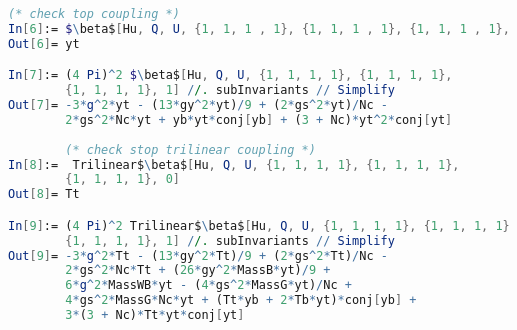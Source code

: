 \documentclass{scrartcl}
\begin{document}
\begin{lstlisting}[language=mathematica,mathescape,columns=flexible,backgroundcolor=\color{light-gray}]
        (* check top coupling *)
In[6]:= $\beta$[Hu, Q, U, {1, 1, 1 , 1}, {1, 1, 1 , 1}, {1, 1, 1 , 1}, 0]
Out[6]= yt

In[7]:= (4 Pi)^2 $\beta$[Hu, Q, U, {1, 1, 1, 1}, {1, 1, 1, 1}, 
        {1, 1, 1, 1}, 1] //. subInvariants // Simplify
Out[7]= -3*g^2*yt - (13*gy^2*yt)/9 + (2*gs^2*yt)/Nc - 
        2*gs^2*Nc*yt + yb*yt*conj[yb] + (3 + Nc)*yt^2*conj[yt]
        
        (* check stop trilinear coupling *)
In[8]:=  Trilinear$\beta$[Hu, Q, U, {1, 1, 1, 1}, {1, 1, 1, 1}, 
        {1, 1, 1, 1}, 0]
Out[8]= Tt

In[9]:= (4 Pi)^2 Trilinear$\beta$[Hu, Q, U, {1, 1, 1, 1}, {1, 1, 1, 1}, 
        {1, 1, 1, 1}, 1] //. subInvariants // Simplify
Out[9]= -3*g^2*Tt - (13*gy^2*Tt)/9 + (2*gs^2*Tt)/Nc - 
        2*gs^2*Nc*Tt + (26*gy^2*MassB*yt)/9 + 
        6*g^2*MassWB*yt - (4*gs^2*MassG*yt)/Nc + 
        4*gs^2*MassG*Nc*yt + (Tt*yb + 2*Tb*yt)*conj[yb] + 
        3*(3 + Nc)*Tt*yt*conj[yt]

\end{lstlisting}
\newpage


\end{document}
